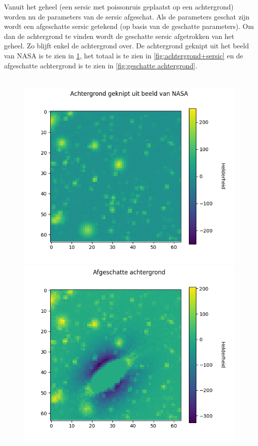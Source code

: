 Vanuit het geheel (een sersic met poissonruis geplaatst op een achtergrond) worden nu de parameters van de sersic afgeschat. Als de parameters geschat zijn wordt een afgeschatte sersic getekend (op basis van de geschatte parameters). Om dan de achtergrond te vinden wordt de geschatte sersic afgetrokken van het geheel. Zo blijft enkel de achtergrond over. De achtergrond geknipt uit het beeld van NASA is te zien in \cref{fig:achtergrond nasa}, het totaal is te zien in \cref{fig:achtergrond+sersic} en de afgeschatte achtergrond is te zien in \cref{fig:geschatte achtergrond}.
\\ \\
\begin{figure}
    \begin{minipage}{0.98\linewidth}
        \centering
        \includegraphics[width=0.95\linewidth]{Figures/sersic_achtergrond_656679_clip2.png}
        \label{fig:achtergrond nasa}
        \centering
        \includegraphics[width=0.95\linewidth]{Figures/afgeschatte_achtergrond_656679.png}

\end{minipage}
\end{figure}
